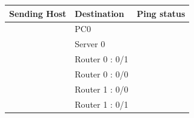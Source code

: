 \documentclass[a4paper,11pt]{article}
\begin{document}
\begin{enumerate}
\begin{enumerate}
                    \begin{table}[H]
                        \centering
                        \begin{tabular}{| m{9em}| m{12em}| m{9em} |}
                            \hline
                            \textbf{Sending Host}                                           & \textbf{Destination} & \textbf{Ping status}                                                     \\
                            \hline
                            {\cellcolor[rgb]{0.333,0.686,1}}                                & PC0                  & {\cellcolor[rgb]{0.365,1,0.741}}                                         \\
                            \hhline{|>{\arrayrulecolor[rgb]{0.333,0.686,1}}->{\arrayrulecolor{black}}->{\arrayrulecolor[rgb]{0.365,1,0.741}}->{\arrayrulecolor{black}}|}
                            {\cellcolor[rgb]{0.333,0.686,1}}                                & Server 0             & {\cellcolor[rgb]{0.365,1,0.741}}                                         \\
                            \hhline{|>{\arrayrulecolor[rgb]{0.333,0.686,1}}->{\arrayrulecolor{black}}->{\arrayrulecolor[rgb]{0.365,1,0.741}}->{\arrayrulecolor{black}}|}
                            {\cellcolor[rgb]{0.333,0.686,1}}                                & Router 0 : 0/1       & {\cellcolor[rgb]{0.365,1,0.741}}                                         \\
                            \hhline{|>{\arrayrulecolor[rgb]{0.333,0.686,1}}->{\arrayrulecolor{black}}->{\arrayrulecolor[rgb]{0.365,1,0.741}}->{\arrayrulecolor{black}}|}
                            {\cellcolor[rgb]{0.333,0.686,1}}                                & Router 0 : 0/0       & {\cellcolor[rgb]{0.365,1,0.741}}                                         \\
                            \hhline{|>{\arrayrulecolor[rgb]{0.333,0.686,1}}->{\arrayrulecolor{black}}->{\arrayrulecolor[rgb]{0.365,1,0.741}}->{\arrayrulecolor{black}}|}
                            {\cellcolor[rgb]{0.333,0.686,1}}                                & Router 1 : 0/0       & {\cellcolor[rgb]{0.365,1,0.741}}                                         \\
                            \hhline{|>{\arrayrulecolor[rgb]{0.333,0.686,1}}->{\arrayrulecolor{black}}->{\arrayrulecolor[rgb]{0.365,1,0.741}}->{\arrayrulecolor{black}}|}
                            {\cellcolor[rgb]{0.333,0.686,1}}                                & Router 1 : 0/1       & {\cellcolor[rgb]{0.365,1,0.741}}                                         \\

\end{tabular}
\end{table}
\end{enumerate}
\end{enumerate}
\end{document}
